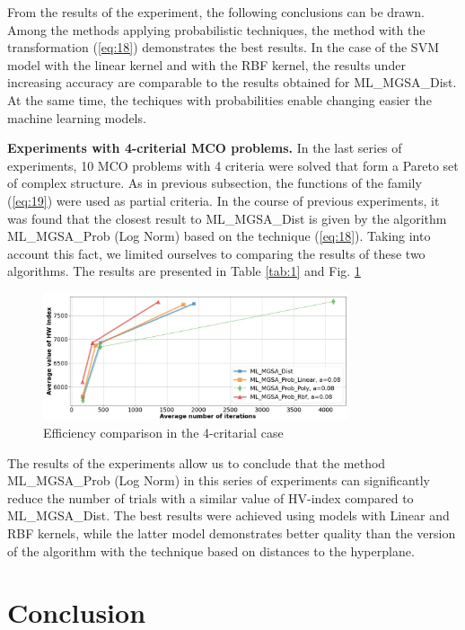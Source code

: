 \documentclass[runningheads]{llncs}
\begin{document}
From the results of the experiment, the following conclusions can be drawn. Among the methods applying probabilistic techniques, the method with the transformation (\ref{eq:18}) demonstrates the best results. In the case of the SVM model with the linear kernel and with the RBF kernel, the results under increasing accuracy are comparable to the results obtained for ML\_MGSA\_Dist. At the same time, the techiques with probabilities enable changing easier the machine learning models. 

\textbf{Experiments with 4-criterial MCO problems.} In the last series of experiments, 10 MCO problems with 4 criteria were solved that form a Pareto set of complex structure. As in previous subsection, the functions of the family (\ref{eq:19}) were used as partial criteria. In the course of previous experiments, it was found that the closest result to ML\_MGSA\_Dist is given by the algorithm ML\_MGSA\_Prob (Log Norm) based on the technique (\ref{eq:18}). Taking into account this fact, we limited ourselves to comparing the results of these two algorithms. The results are presented in Table \ref{tab:1} and Fig. \ref{fig:6}

\begin{figure}
\centering
\includegraphics[width=0.8\textwidth]{Fig6.png}
\caption{Efficiency comparison in the 4-critarial case} 
\label{fig:6}
\end{figure}

The results of the experiments allow us to conclude that the method ML\_MGSA\_Prob (Log Norm) in this series of experiments can significantly reduce the number of trials with a similar value of HV-index compared to ML\_MGSA\_Dist. The best results were achieved using models with Linear and RBF kernels, while the latter model demonstrates better quality than the version of the algorithm with the technique \cite{ML_MCO_2023} based on distances to the hyperplane. 

\section{Conclusion}
\end{document}
